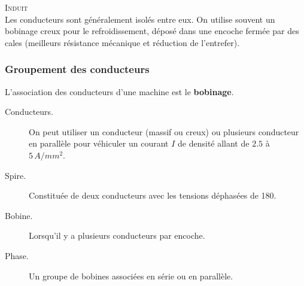 		\textsc{Induit}\\
		Les conducteurs sont généralement isolés entre eux. On utilise souvent 
		un bobinage creux pour le refroidissement, déposé dans une encoche fermée par des cales (meilleurs résistance mécanique et réduction de l'entrefer).  
		
		\subsubsection{Groupement des conducteurs}
		L'association des conducteurs d'une machine est le \textbf{bobinage}. 
		\begin{description}
		\item[Conducteurs.] On peut utiliser un conducteur (massif ou creux) ou plusieurs conducteur en parallèle pour 
		véhiculer un courant $I$ de densité allant de $2.5$ à $5\, A/mm^2$.
		\item[Spire.] Constituée de deux conducteurs avec les tensions déphasées de 180\degres .
		\item[Bobine.] Lorsqu'il y a plusieurs conducteurs par encoche.
		\item[Phase.] Un groupe de bobines associées en série ou en parallèle.
		\end{description}
		
